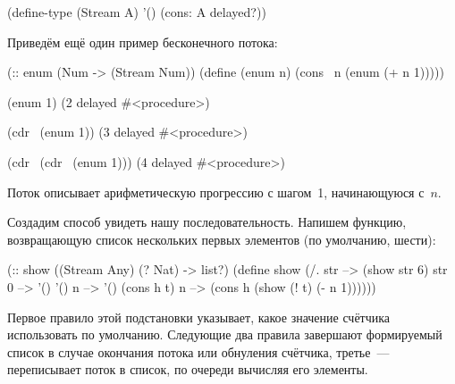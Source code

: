 \begin{Definition}
(define-type (Stream A)
  '()
  (cons: A delayed?))
\end{Definition}

\noindent%
Приведём ещё один пример бесконечного потока:

\begin{Definition}[emph={n}]
(:: enum (Num -> (Stream Num))
 (define (enum n) 
   (cons~ n (enum (+ n 1)))))
\end{Definition}

\REPL
  {(enum 1)}
  {(2 delayed \#<procedure>)}

\REPL
  {(cdr~ (enum 1))}
  {(3 delayed \#<procedure>)}

\REPL
  {(cdr~ (cdr~ (enum 1)))}
  {(4 delayed \#<procedure>)}

Поток  описывает арифметическую прогрессию с шагом~1, начинающуюся с~$n$.

Создадим способ увидеть нашу последовательность. Напишем функцию, возвращающую список нескольких первых элементов (по умолчанию, шести):
\begin{Definition}[emph={str,n}]
(:: show ((Stream Any) (? Nat) -> list?)
 (define show
   (/. str   --> (show str 6)
       str 0 --> '()
       '() n --> '()
       (cons h t) n --> (cons h (show (! t) (- n 1))))))
\end{Definition}
Первое правило этой подстановки указывает, какое значение счётчика использовать по умолчанию. Следующие два правила завершают формируемый список в случае окончания потока или обнуления счётчика, третье~--- переписывает поток в список, по очереди вычисляя его элементы.

